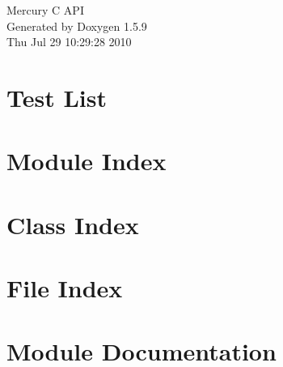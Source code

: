 \documentclass[a4paper]{book}
\begin{document}
\hypersetup{pageanchor=false}
\begin{titlepage}
\vspace*{7cm}
\begin{center}
{\Large Mercury C API }\\
\vspace*{1cm}
{\large Generated by Doxygen 1.5.9}\\
\vspace*{0.5cm}
{\small Thu Jul 29 10:29:28 2010}\\
\end{center}
\end{titlepage}
\clearemptydoublepage
{}
\tableofcontents
\clearemptydoublepage
{}
\hypersetup{pageanchor=true}
\chapter{Test List}
\label{test}
\hypertarget{test}{}

\chapter{Module Index}

\chapter{Class Index}

\chapter{File Index}

\chapter{Module Documentation}



\end{document}
